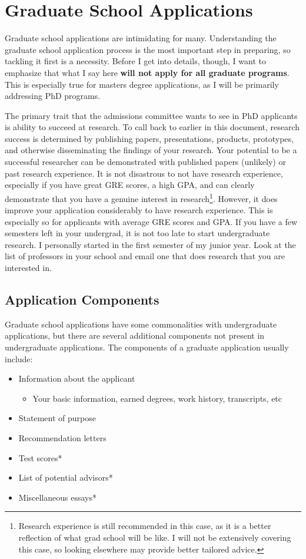 \documentclass[12pt]{article}
\begin{document}
\section{Graduate School Applications}

Graduate school applications are intimidating for many. Understanding the graduate school application process is the most important step in preparing, so tackling it first is a necessity. Before I get into details, though, I want to emphasize that what I say here \textbf{will not apply for all graduate programs}. This is especially true for masters degree applications, as I will be primarily addressing PhD programs.

The primary trait that the admissions committee wants to see in PhD applicants is ability to succeed at research. To call back to earlier in this document, research success is determined by publishing papers, presentations, products, prototypes, and otherwise disseminating the findings of your research. Your potential to be a successful researcher can be demonstrated with published papers (unlikely) or past research experience. It is not disastrous to not have research experience, especially if you have great GRE scores, a high GPA, and can clearly demonstrate that you have a genuine interest in research\footnote{Research experience is still recommended in this case, as it is a better reflection of what grad school will be like. I will not be extensively covering this case, so looking elsewhere may provide better tailored advice.}. However, it does improve your application considerably to have research experience. This is especially so for applicants with average GRE scores and GPA. If you have a few semesters left in your undergrad, it is not too late to start undergraduate research. I personally started in the first semester of my junior year. Look at the list of professors in your school and email one that does research that you are interested in.

\subsection{Application Components}

Graduate school applications have some commonalities with undergraduate applications, but there are several additional components not present in undergraduate applications. The components of a graduate application usually include:

\begin{itemize}
    \item Information about the applicant
    \begin{itemize}
        \item Your basic information, earned degrees, work history, transcripts, etc 
    \end{itemize}
    \item Statement of purpose
    \item Recommendation letters
    \item Test scores*
    \item List of potential advisors*
    \item Miscellaneous essays*
\end{itemize}
\end{document}
